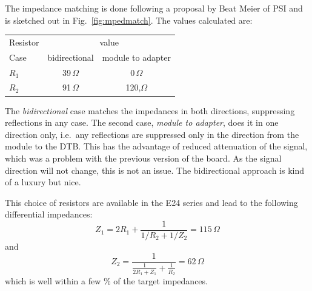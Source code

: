 The impedance matching is done following a proposal by Beat Meier of PSI and is sketched out in Fig.~\ref{fig:mpedmatch}. The values calculated are:
\begin{center}
\begin{tabular}{lcc}
    \toprule %
    Resistor & \multicolumn{2}{c}{value} \\
    Case & bidirectional & module to adapter \\
    \midrule %
    $R_1$ & 39\,$\Omega$ & 0\,$\Omega$ \\
    $R_2$ & 91\,$\Omega$ & 120,$\Omega$ \\
    \bottomrule %
\end{tabular}
\end{center}
The \emph{bidirectional} case matches the impedances in both directions, suppressing reflections in any case. The second case, \emph{module to adapter}, does it in one direction only, i.e.~any reflections are suppressed only in the direction from the module to the DTB. This has the advantage of reduced attenuation of the signal, which was a problem with the previous version of the board. As the signal direction will not change, this is not an issue. The bidirectional approach is kind of a luxury but nice.

This choice of resistors are available in the E24 series and lead to the following differential impedances:
\begin{equation}
Z_1 = 2R_1 + \frac{1}{1/R_2 + 1/Z_2} = 115\,\Omega
\end{equation}
and
\begin{equation}
Z_2 = \frac{1}{\frac{1}{2R_1+Z_1}+\frac{1}{R_2}} = 62\,\Omega
\end{equation}
which is well within a few \% of the target impedances.

